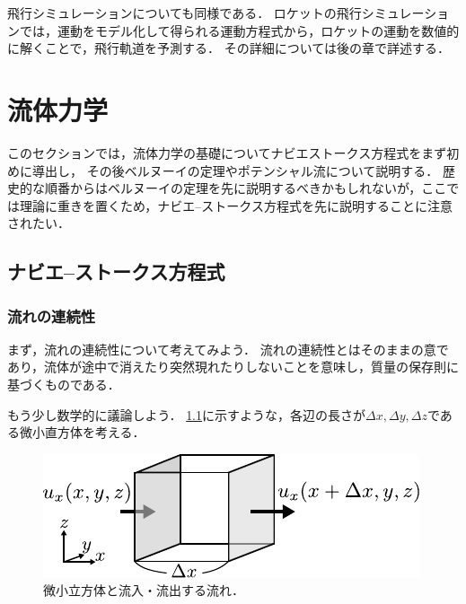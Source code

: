 \documentclass[uplatex,dvipdfmx,a4j,11pt]{jsreport}
\numberwithin{equation}{chapter}
\begin{document}
\enskip

飛行シミュレーションについても同様である．
ロケットの飛行シミュレーションでは，運動をモデル化して得られる運動方程式から，ロケットの運動を数値的に解くことで，飛行軌道を予測する．
その詳細については後の章で詳述する．


\chapter{流体力学}

このセクションでは，流体力学の基礎についてナビエストークス方程式をまず初めに導出し，
その後ベルヌーイの定理やポテンシャル流について説明する．
歴史的な順番からはベルヌーイの定理を先に説明するべきかもしれないが，ここでは理論に重きを置くため，ナビエ--ストークス方程式を先に説明することに注意されたい．

\section{ナビエ--ストークス方程式}
\subsection{流れの連続性}
まず，流れの連続性について考えてみよう．
流れの連続性とはそのままの意であり，流体が途中で消えたり突然現れたりしないことを意味し，質量の保存則に基づくものである．

\enskip

もう少し数学的に議論しよう．
\cref{fig:continuity_equation}に示すような，各辺の長さが$\Delta x, \Delta y, \Delta z$である微小直方体を考える．
\begin{figure}[H]
  \centering
  \includegraphics{aero/img/continuity_equation.pdf}
  \caption{微小立方体と流入・流出する流れ．}
  \label{fig:continuity_equation}
\end{figure}
\end{document}
